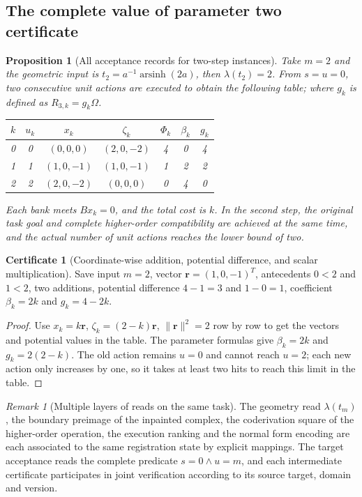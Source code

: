 \documentclass[12pt,a4paper,openany,notitlepage]{report}
\theoremstyle{plain}
\newtheorem{proposition}[theorem]{Proposition}
\theoremstyle{definition}
\newtheorem*{certificate}{Certificate}
\theoremstyle{remark}
\newtheorem{remark}[theorem]{Remark}
\def\mathcal#1{#1}\def\mathsf#1{#1}\def\mathbb#1{#1}%
\begin{document}
\begin{CJK*}
\section { The complete value of parameter two certificate }

\begin{proposition}
[All acceptance records for two-step instances]\label{exp:joint:m-two}
Take $m=2$ and the geometric input is $t_2=a^{-1}\operatorname{arsinh}(2a)$, then $\lambda(t_2)=2$. From $s=u=0$, two consecutive unit actions are executed to obtain the following table; where $g_k$ is defined as $\mathcal R_{3,k}=g_k\Omega$.\begin{center}
\begin{tabular}
{ccccccc}\toprule
$k$&
$u_k$&
$x_k$&
$\zeta_k$&
$\Phi_k$&
$\beta_k$&
$g_k$\\
\midrule
0&
0&
$(0,0,0)$&
$(2,0,-2)$&
4&
0&
4\\
1&
1&
$(1,0,-1)$&
$(1,0,-1)$&
1&
2&
2\\
2&
2&
$(2,0,-2)$&
$(0,0,0)$&
0&
4&
0\\
\bottomrule
\end{tabular}
\end{center}
Each bank meets $Bx_k=0$, and the total cost is $k$. In the second step, the original task goal and complete higher-order compatibility are achieved at the same time, and the actual number of unit actions reaches the lower bound of two.\end{proposition}
\begin{certificate}
[Coordinate-wise addition, potential difference, and scalar multiplication]Save input $m=2$, vector $\mathbf r=(1,0,-1)^{\mathsf T}$, antecedents $0<2$ and $1<2$, two additions, potential difference $4-1=3$ and $1-0=1$, coefficient $\beta_k=2k$ and $g_k=4-2k$.\end{certificate}
\begin{proof}
Use $x_k=k\mathbf r$, $\zeta_k=(2-k)\mathbf r$, $\|\mathbf r\|^2=2$ row by row to get the vectors and potential values in the table. The parameter formulas give $\beta_k=2k$ and $g_k=2(2-k)$. The old action remains $u=0$ and cannot reach $u=2$; each new action only increases by one, so it takes at least two hits to reach this limit in the table.\end{proof}


\begin{remark}
[Multiple layers of reads on the same task]The geometry read $\lambda(t_m)$, the boundary preimage of the inpainted complex, the coderivation square of the higher-order operation, the execution ranking and the normal form encoding are each associated to the same registration state by explicit mappings. The target acceptance reads the complete predicate $s=0\land u=m$, and each intermediate certificate participates in joint verification according to its source target, domain and version.\end{remark}



\end{CJK*}
\end{document}

